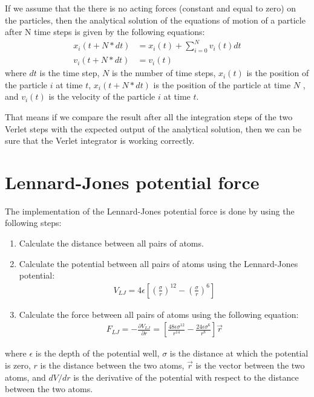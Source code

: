     If we assume that the there is no acting forces (constant and equal to zero) on the particles, then the analytical solution of the equations of motion of a particle after N time steps is given by the following equations:
    \begin{equation}
    \label{eq:analytical2}
        \begin{aligned}
        x_i(t+N*dt) &= x_i(t) + \sum_{i=0}^{N}v_i(t)dt \\
        v_i(t+N*dt) &= v_i(t)
        \end{aligned}
    \end{equation}
    where $dt$ is the time step, $N$ is the number of time steps, $x_i(t)$ is the position of the particle $i$ at time $t$, $x_i(t+N*dt)$ is the position of the particle at time $N$ , and $v_i(t)$ is the velocity of the particle $i$ at time $t$.

    That means if we compare the result after all the integration steps of the two Verlet steps with the expected output of the analytical solution, then we can be sure that the Verlet integrator is working correctly.

\section{Lennard-Jones potential force}
    The implementation of the Lennard-Jones potential force is done by using the following steps:
    \begin{enumerate}
        \item Calculate the distance between all pairs of atoms.
        \item Calculate the potential between all pairs of atoms using the Lennard-Jones potential:
        \begin{equation}
        \label{eq:LJ}
            \begin{aligned}
            V_{LJ} = 4\epsilon\left[\left(\frac{\sigma}{r}\right)^{12} - \left(\frac{\sigma}{r}\right)^{6}\right]
            \end{aligned}
        \end{equation}
        \item Calculate the force between all pairs of atoms using the following equation:
        \begin{equation}
        \label{eq:force}
            \begin{aligned}
            F_{LJ} = -\frac{\partial V_{LJ}}{\partial r} = \left[\frac{48 \epsilon \sigma^{12}}{r^{14}} - \frac{24 \epsilon \sigma^6}{r^{8}} \right] \vec{r}
            \end{aligned}
        \end{equation}
    \end{enumerate}
    where $\epsilon$ is the depth of the potential well, $\sigma$ is the distance at which the potential is zero, $r$ is the distance between the two atoms, $\vec{r}$ is the vector between the two atoms, and $dV/dr$ is the derivative of the potential with respect to the distance between the two atoms.


